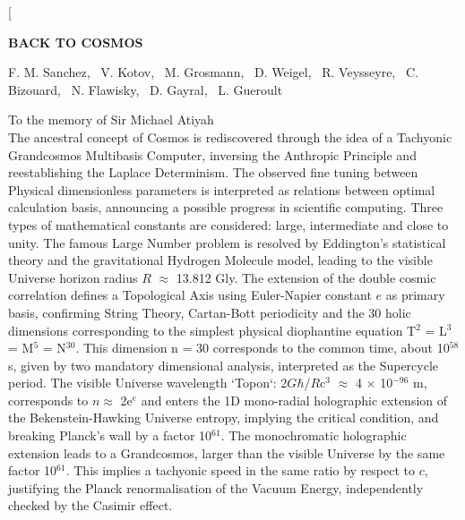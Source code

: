 \documentclass[twoside,draft]{article}
\begin{document}
\begin{sloppypar}

\renewcommand{\refname}{References}
\renewcommand{\tablename}{\small Table}
\renewcommand{\figurename}{\small Fig.}
\renewcommand{\contentsname}{Contents}


\twocolumn[%
\begin{center}
\renewcommand{\baselinestretch}{0.93}
{\Large\bfseries BACK TO COSMOS

}\par
\renewcommand{\baselinestretch}{1.0}
\bigskip
F. M. Sanchez, \ V. Kotov, \ M. Grosmann, \ D. Weigel, \ R. Veysseyre, \ C. Bizouard, \ N. Flawisky, \ D. Gayral, \ L. Gueroult\\
\par
\medskip
{\small\parbox{11cm}{%
\hfill To the memory of Sir Michael Atiyah\\
The ancestral concept of Cosmos is rediscovered through the idea of a Tachyonic Grandcosmos Multibasis Computer, inversing the Anthropic Principle and reestablishing the Laplace Determinism.
The observed fine tuning between Physical dimensionless parameters is interpreted as relations between optimal calculation basis, announcing a possible progress in scientific computing.
Three types of mathematical constants are considered: large, intermediate and close to unity. The famous Large Number problem is resolved by Eddington's statistical theory and the gravitational Hydrogen Molecule model, leading to the visible Universe horizon radius $R$ $\approx$ 13.812 Gly.
The extension of the double cosmic correlation defines a Topological Axis using Euler-Napier constant $e$ as primary basis, confirming String Theory, Cartan-Bott periodicity and the 30 holic dimensions corresponding to the simplest physical diophantine equation T$^2\!$ = L$^3\!$ = M$^5\!$ = N$^{30}\!$.
This dimension n = 30 corresponds to the common time, about 10$^{58}\!$ s, given by two mandatory dimensional analysis, interpreted as the Supercycle period.
The visible Universe wavelength `Topon`: 2$G$$\hbar$/$R$c$^3\!$ $\approx$ 4 $\times$ 10$^{-96}\!$ m, corresponds to $n \approx$ 2e$^e\!$ and enters the 1D mono-radial holographic extension of the Bekenstein-Hawking Universe entropy, implying the critical condition, and breaking Planck's wall by a factor 10$^{61}\!$.
The monochromatic holographic extension leads to a Grandcosmos, larger than the visible Universe by the same factor 10$^{61}\!$.
This implies a tachyonic speed in the same ratio by respect to $c$, justifying the Planck renormalisation of the Vacuum Energy, independently checked by the Casimir effect.
$$}}
\end{center}
\end{sloppypar}
\end{document}
